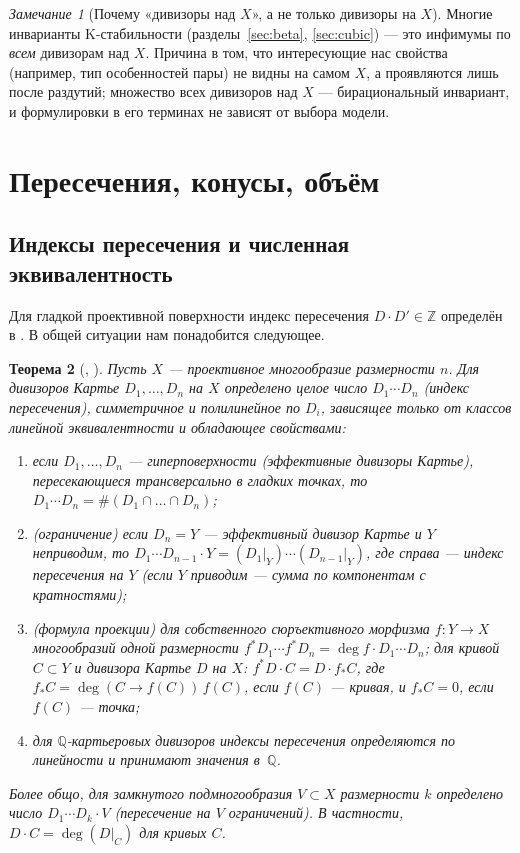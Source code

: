 \documentclass[11pt,a4paper]{article}
\theoremstyle{plain}
\newtheorem{theorem}{Теорема}[section]
\theoremstyle{definition}
\theoremstyle{remark}
\newtheorem{remark}[theorem]{Замечание}
\newcommand{\Z}{\mathbb{Z}}
\newcommand{\Q}{\mathbb{Q}}
\begin{document}
\begin{remark}[Почему «дивизоры над $X$», а не только дивизоры на $X$]
Многие инварианты K-стабильности (разделы~\ref{sec:beta}, \ref{sec:cubic}) --- это инфимумы по
\emph{всем} дивизорам над $X$. Причина в том, что интересующие нас свойства (например, тип
особенностей пары) не видны на самом $X$, а проявляются лишь после раздутий; множество всех
дивизоров над $X$ --- бирациональный инвариант, и формулировки в его терминах не зависят от
выбора модели.
\end{remark}

\section{Пересечения, конусы, объём}\label{sec:cones}

\subsection{Индексы пересечения и численная эквивалентность}

Для гладкой проективной поверхности индекс пересечения $D\cdot D'\in\Z$ определён в
\cite[теорема~0.21]{AG}. В общей ситуации нам понадобится следующее.

\begin{theorem}[{\cite[гл.~1]{Fulton}, \cite[I.1]{La}}]\label{thm:intersection-numbers}
Пусть $X$ --- проективное многообразие размерности $n$. Для дивизоров Картье $D_1,\dots,D_n$ на $X$
определено целое число $D_1\cdots D_n$ (\emph{индекс пересечения}), симметричное и полилинейное по
$D_i$, зависящее только от классов линейной эквивалентности и обладающее свойствами:
\begin{enumerate}
\item если $D_1,\dots,D_n$ --- гиперповерхности (эффективные дивизоры Картье), пересекающиеся
трансверсально в гладких точках, то $D_1\cdots D_n=\#(D_1\cap\dots\cap D_n)$;
\item (\emph{ограничение}) если $D_n=Y$ --- эффективный дивизор Картье и $Y$ неприводим, то
$D_1\cdots D_{n-1}\cdot Y=(D_1|_Y)\cdots(D_{n-1}|_Y)$, где справа --- индекс пересечения на $Y$
(если $Y$ приводим --- сумма по компонентам с кратностями);
\item (\emph{формула проекции}) для собственного сюръективного морфизма $f\colon Y\to X$
многообразий одной размерности $f^*D_1\cdots f^*D_n=\deg f\cdot D_1\cdots D_n$; для кривой
$C\subset Y$ и дивизора Картье $D$ на $X$: $f^*D\cdot C=D\cdot f_*C$, где $f_*C=\deg(C\to f(C))\,f(C)$,
если $f(C)$ --- кривая, и $f_*C=0$, если $f(C)$ --- точка;
\item для $\Q$-картьеровых дивизоров индексы пересечения определяются по линейности и принимают
значения в~$\Q$.
\end{enumerate}
Более общо, для замкнутого подмногообразия $V\subset X$ размерности $k$ определено число
$D_1\cdots D_k\cdot V$ (пересечение на $V$ ограничений). В частности, $D\cdot C=\deg(D|_C)$ для
кривых $C$.
\end{theorem}
\end{document}

